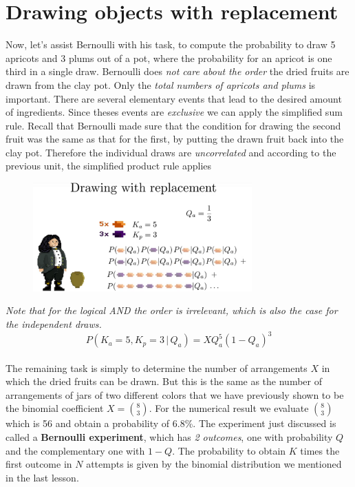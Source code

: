 \documentclass[12pt, a4paper]{scrartcl}
\begin{document}
\section*{Drawing objects with replacement}
Now, let’s assist Bernoulli with his task, to compute the probability to draw 5 apricots and 3 plums out of a pot, where the probability for an apricot is one third in a single draw.
Bernoulli does \textit{not care about the order} the dried fruits are drawn from the clay pot. Only the \textit{total numbers of apricots and plums} is important. There are several elementary events that lead to the desired amount of ingredients.
Since theses events are \textit{exclusive} we can apply the simplified sum rule.
Recall that Bernoulli made sure that the condition for drawing the second fruit was the same as that for the first, by putting the drawn fruit back into the clay pot. 
Therefore the individual draws are \textit{uncorrelated} and according to the previous unit, the simplified product rule applies\\
 \begin{figure}[H]
	\centering
	\includegraphics[width=0.75\textwidth]{4_5.png}
\end{figure}
\textit{Note that for the logical AND the order is irrelevant, which is also the case for the independent draws.}
\begin{equation*}\boxed{P(K_a=5,K_p=3\,|\,Q_a)=XQ_a^5(1-Q_a)^3
}\end{equation*}\\
The remaining task is simply to determine the number of arrangements $X$ in which the dried fruits can be drawn. But this is the same as the number of arrangements of jars of two different colors that we have previously shown to be the binomial coefficient $X={8 \choose 3}$.
For the numerical result we evaluate ${8 \choose 3}$ which is 56 and obtain a probability of 6.8\%.
The experiment just discussed is called a \textbf{Bernoulli experiment}, which has \textit{2 outcomes}, one with probability $Q$ and the complementary one with $1-Q$.
The probability to obtain $K$ times the first outcome in $N$ attempts is given by the binomial distribution we mentioned in the last lesson.\\
\end{document}
